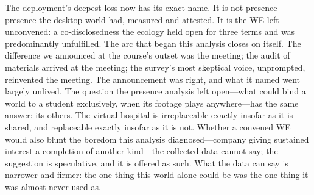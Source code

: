 The deployment's deepest loss now has its exact name. It is not
presence---presence the desktop world had, measured and attested. It
is the WE left unconvened: a co-disclosedness the ecology held open
for three terms and was predominantly unfulfilled. The arc that
began this analysis closes on itself. The difference we announced at
the course's outset was the meeting; the audit of materials arrived
at the meeting; the survey's most skeptical voice, unprompted,
reinvented the meeting. The announcement was right, and what it named
went largely unlived. The question the presence analysis left
open---what could bind a world to a student exclusively, when its
footage plays anywhere---has the same answer: its others. The virtual
hospital is irreplaceable exactly insofar as it is shared, and
replaceable exactly insofar as it is not. Whether a convened WE would
also blunt the boredom this analysis diagnosed---company giving
sustained interest a completion of another kind---the collected data
cannot say; the suggestion is speculative, and it is offered as such.
What the data can say is narrower and firmer: the one thing this
world alone could be was the one thing it was almost never used as.


